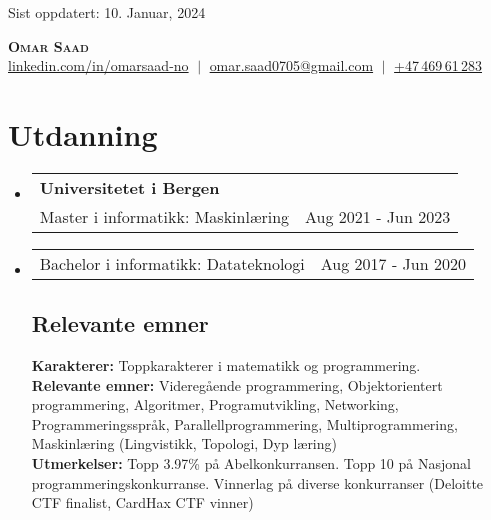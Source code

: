 \documentclass[letterpaper,11pt]{article}
\makeatletter
\newcommand{\resumeSubHeadingListStart}{\begin{itemize}[leftmargin=0.15in, label={}]}
\newcommand{\resumeSubHeadingListEnd}{\end{itemize}}
\newcommand{\resumeProjectHeading}[2]{
    \item
    \begin{tabular*}{0.97\textwidth}{l@{\extracolsep{\fill}}r}
      \small#1 & #2 \\
    \end{tabular*}\vspace{-7pt}
}
\makeatother
\begin{document}
\begin{flushright}
  \vspace{-4pt}
  \color{gray}
  \small{Sist oppdatert: 10. Januar, 2024}
\end{flushright}

\vspace{-35pt}

\begin{center}
    \textbf{\Huge \scshape Omar Saad} \\ \vspace{8pt}
    \small 
        \href{https://www.linkedin.com/in/omarsaad-no}{linkedin.com/in/omarsaad-no} $\;|\;$
        \href{mailto:omar.saad0705@gmail.com}{omar.saad0705@gmail.com} $\;|\;$
        \href{tel:+4746961283}{+47\,469\,61\,283}
\end{center}

\section{Utdanning}
  \resumeSubHeadingListStart
  
    \resumeProjectHeading
      {\textbf{Universitetet i Bergen} \\
      \small{Master i informatikk: Maskinlæring}}{Aug 2021 - Jun 2023}

    \resumeProjectHeading
      {\small{Bachelor i informatikk: Datateknologi}}{Aug 2017 - Jun 2020}

    \vspace{-5pt}
    \subsection{Relevante emner}
      \textbf{Karakterer:} Toppkarakterer i matematikk og programmering.\\
      \textbf{Relevante emner:} Videregående programmering, Objektorientert programmering, Algoritmer, Programutvikling, Networking, Programmeringsspråk, Parallellprogrammering, Multiprogrammering, Maskinlæring (Lingvistikk, Topologi, Dyp læring) \\
      \textbf{Utmerkelser:} Topp 3.97\% på Abelkonkurransen. Topp 10 på Nasjonal programmeringskonkurranse. Vinnerlag på diverse konkurranser (Deloitte CTF finalist, CardHax CTF vinner)

  \resumeSubHeadingListEnd
\end{document}
